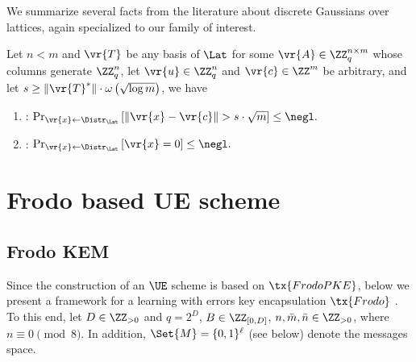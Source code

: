 \documentclass{fundam}
\begin{document}

\vspace{0.5cm}
We summarize several facts from the literature about discrete Gaussians over lattices, again specialized to our family of interest.
\begin{lemma}\label{lem::02}Let $n<m$ and $\vr{T}$ be any basis of $\Lat$ for some $\vr{A}\in\ZZ_{q}^{n\times m}$ whose columns generate $\ZZ_{q}^{n}$, let $\vr{u}\in\ZZ_{q}^{n}$ and $\vr{c}\in\ZZ^{m}$
	be arbitrary, and let $s\geq \| \vr{T}^{*} \| \cdot \omega \left( \sqrt{\log{m}} \right)$, we have
	\begin{enumerate}
		\item {\normalfont \cite{micciancio2007worst,cash2012bonsai}:}
		$\Pr_{\vr{x}\gets  \Distr_{\Lat}} \left[ \| \vr{x}-\vr{c}\| >  s \cdot \sqrt{m} \right]\leq \negl.$
		
		\item {\normalfont \cite{peikert2006efficient,cash2012bonsai}:} 
		$\Pr_{\vr{x}\gets  \Distr_{\Lat}} \left[ \vr{x}=0 \right]\leq \negl.$
		
	\end{enumerate}
\end{lemma}


\section{Frodo based UE scheme}
\subsection{Frodo KEM}\label{sec::Frodo}
Since the construction of an $\UE$ scheme is based on $\tx{FrodoPKE}$, below we present a framework for a learning with errors key encapsulation $\tx{Frodo}$ \cite{Frodo,Frodo2}. To this end, let $D\in\ZZ_{>0}$ and $q=2^{D}$, $B\in\ZZ_{[0,D]}$, $n,\bar{m}, \bar{n}\in \ZZ_{>0}$, where $n\equiv 0 \pmod{8}$. In addition, $\Set{M}=\{0,1\}^{\ell}$ (see below) denote the messages space. 
\end{document}
